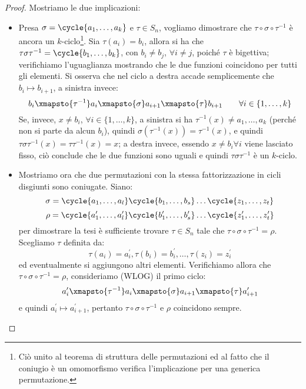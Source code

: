 \documentclass[11pt]{scrartcl}
\begin{document}
\begin{proof}
    Mostriamo le due implicazioni:
        \begin{itemize}
            \item Presa $\sigma = \cycle{a_1,\ldots,a_k}$ e $\tau \in S_n$, vogliamo dimostrare che $\tau\circ\sigma\circ\tau^{-1}$ è ancora un $k$-ciclo\footnote{Ciò unito al teorema di struttura delle permutazioni ed al fatto che il coniugio è un omomorfismo verifica l'implicazione per una generica permutazione.}.
                Sia $\tau(a_i) = b_i$, allora si ha che $\tau\sigma\tau^{-1} = \cycle{b_1,\ldots,b_k}$, con $b_i \ne b_j$, $\forall i \ne j$, poiché $\tau$ è bigettiva; verifichiamo
                l'uguaglianza mostrando che le due funzioni coincidono per tutti gli elementi. Si osserva che nel ciclo a destra accade semplicemente che $b_i \longmapsto b_{i+1}$, a sinistra invece:
                    \[ b_i \xmapsto{\tau^{-1}} a_i \xmapsto{\sigma} a_{i+1} \xmapsto{\tau} b_{i+1} \qquad \forall i \in \{1,\ldots,k\}
                        \]
                Se, invece, $x \ne b_i$, $\forall i \in \{1,\ldots,k\}$, a sinistra si ha $\tau^{-1}(x) \ne a_1,\ldots,a_k$ (perché non si parte da alcun $b_i$), quindi $\sigma(\tau^{-1}(x)) = \tau^{-1}(x)$, e quindi
                $\tau\sigma\tau^{-1}(x) = \tau \tau^{-1} (x) = x$; a destra invece, essendo $x \ne b_i \forall i$ viene lasciato fisso, ciò conclude che le due funzioni sono uguali e quindi $\tau\sigma\tau^{-1}$ è un $k$-ciclo.
            \item Mostriamo ora che due permutazioni con la stessa fattorizzazione in cicli disgiunti sono coniugate. Siano:
                \[ \sigma = \cycle{a_1, \ldots, a_l}\cycle{b_1, \ldots, b_s} \ldots \cycle{z_1, \ldots, z_t}
                    \]\[ \rho = \cycle{a_1^{\prime}, \ldots, a_l^{\prime}}\cycle{b_1^{\prime}, \ldots, b_s^{\prime}} \ldots \cycle{z_1^{\prime}, \ldots, z_t^{\prime}}
                        \]
                per dimostrare la tesi è sufficiente trovare $\tau \in S_n$ tale che $\tau\circ\sigma\circ\tau^{-1} = \rho$. Scegliamo $\tau$ definita da:
                    \[ \tau(a_i) = a_i^{\prime}, \tau(b_i) = b_i^{\prime}, \ldots, \tau(z_i) = z_i^{\prime}
                        \]
                ed eventualmente si aggiungono altri elementi. Verifichiamo allora che $\tau\circ\sigma\circ\tau^{-1} = \rho$, consideriamo (WLOG) il primo ciclo:
                    \[ a_i^{\prime} \xmapsto{\tau^{-1}} a_i \xmapsto{\sigma} a_{i+1} \xmapsto{\tau} a_{i+1}^{\prime}
                        \]
                e quindi $a_i^{\prime} \longmapsto a_{i+1}^{\prime}$, pertanto $\tau\circ\sigma\circ\tau^{-1}$ e $\rho$ coincidono sempre.
        \end{itemize}
\end{proof}
\end{document}
